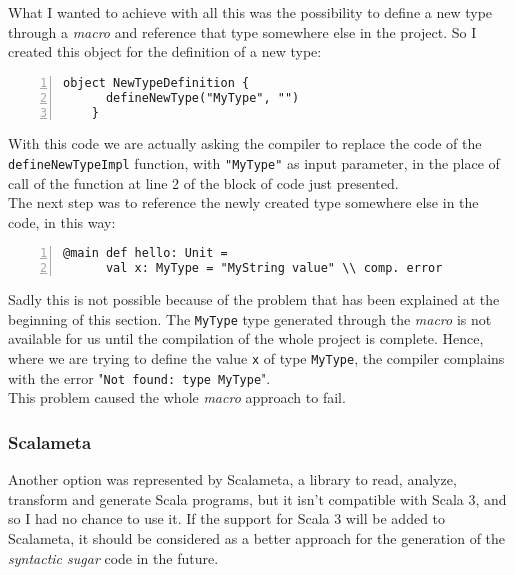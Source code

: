 What I wanted to achieve with all this was the possibility to define a new type through a \textit{macro} and reference that type somewhere else in the project.
So I created this object for the definition of a new type:\\
\begin{minipage}{\linewidth}
  \begin{lstlisting}[numbers=left, numberstyle=\tiny, numbersep=-5pt, stepnumber=1]
    object NewTypeDefinition {
      defineNewType("MyType", "")
    }
  \end{lstlisting}
\end{minipage}
With this code we are actually asking the compiler to replace the code of the \texttt{defineNewTypeImpl} function, with \texttt{"MyType"} as input parameter, in the place of call of the function at line 2 of the block of code just presented.\\
The next step was to reference the newly created type somewhere else in the code, in this way:\\
\begin{minipage}{\linewidth}
  \begin{lstlisting}[numbers=left, numberstyle=\tiny, numbersep=-5pt, stepnumber=1]
    @main def hello: Unit = 
      val x: MyType = "MyString value" \\ comp. error
  \end{lstlisting}
\end{minipage}
Sadly this is not possible because of the problem that has been explained at the beginning of this section.
The \texttt{MyType} type generated through the \textit{macro} is not available for us until the compilation of the whole project is complete.
Hence, where we are trying to define the value \texttt{x} of type \texttt{MyType}, the compiler complains with the error "\texttt{Not found: type MyType}".\\
This problem caused the whole \textit{macro} approach to fail.


\subsubsection{Scalameta}
Another option was represented by Scalameta, a library to read, analyze, transform and generate Scala programs, but it isn't compatible with Scala 3, and so I had no chance to use it.
If the support for Scala 3 will be added to Scalameta, it should be considered as a better approach for the generation of the \textit{syntactic sugar} code in the future.

